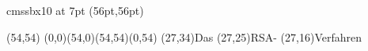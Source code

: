 

\font\myfont cmssbx10 at 7pt
\PapierGroesse(56pt,56pt)




\begin{psfigur}(54,54)
\psPolygon[fuellfarbe=0.753,eckradius=5,linienstil=](0,0)(54,0)(54,54)(0,54)
\psNeueSchicht
\rpin(27,34){\myfont Das}
\rpin(27,25){\myfont RSA-}
\rpin(27,16){\myfont Verfahren}
\end{psfigur}
 

